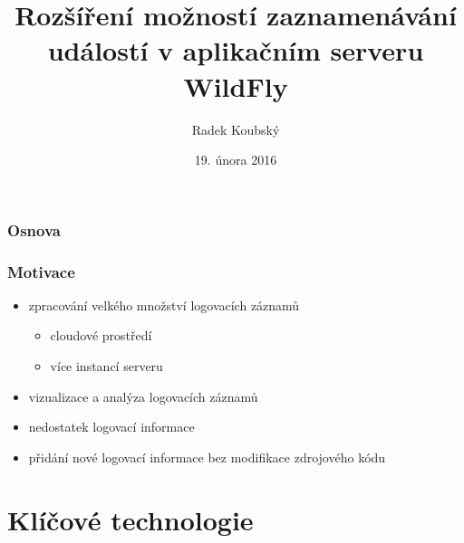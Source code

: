\documentclass{beamer}
\title[Masarykova univerzita]{Rozšíření možností zaznamenávání událostí v aplikačním serveru WildFly} %
\author{Radek Koubský} %
\institute[Fakulta informatiky] %
{
Masarykova univerzita \\ %
\medskip
\textit{Fakulta informatiky} %
}
\date{19. února 2016} %
\begin{document}
\begin{frame}
\titlepage %
\end{frame}

\begin{frame}
\frametitle{Osnova} %
\tableofcontents %
\end{frame}


\begin{frame}
	\frametitle{Motivace}
	\begin{itemize}
		\item zpracování velkého množství logovacích záznamů
		\begin{itemize}
			\item cloudové prostředí
			\item více instancí serveru
		\end{itemize}
		\item vizualizace a analýza logovacích záznamů
		\item nedostatek logovací informace
		\item přidání nové logovací informace bez modifikace zdrojového kódu
	\end{itemize}
\end{frame}

\section{Klíčové technologie} %
\end{document}

